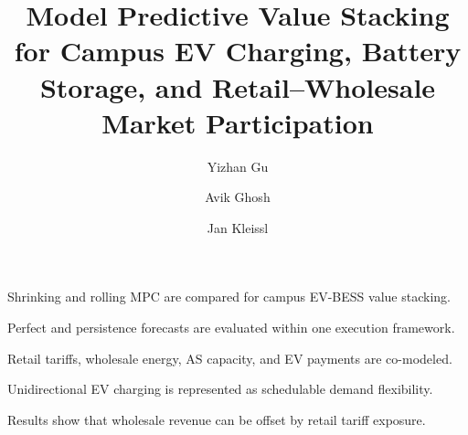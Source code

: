 \documentclass[final,5p,times]{elsarticle}
\begin{document}
\begin{frontmatter}

\title{Model Predictive Value Stacking for Campus EV Charging, Battery Storage, and Retail--Wholesale Market Participation}

\author[ucsd]{Yizhan Gu}
\author[ucsd]{Avik Ghosh}
\author[ucsd]{Jan Kleissl}


\begin{highlights}
\item Shrinking and rolling MPC are compared for campus EV-BESS value stacking.
\item Perfect and persistence forecasts are evaluated within one execution framework.
\item Retail tariffs, wholesale energy, AS capacity, and EV payments are co-modeled.
\item Unidirectional EV charging is represented as schedulable demand flexibility.
\item Results show that wholesale revenue can be offset by retail tariff exposure.
\end{highlights}


\end{frontmatter}
\end{document}
